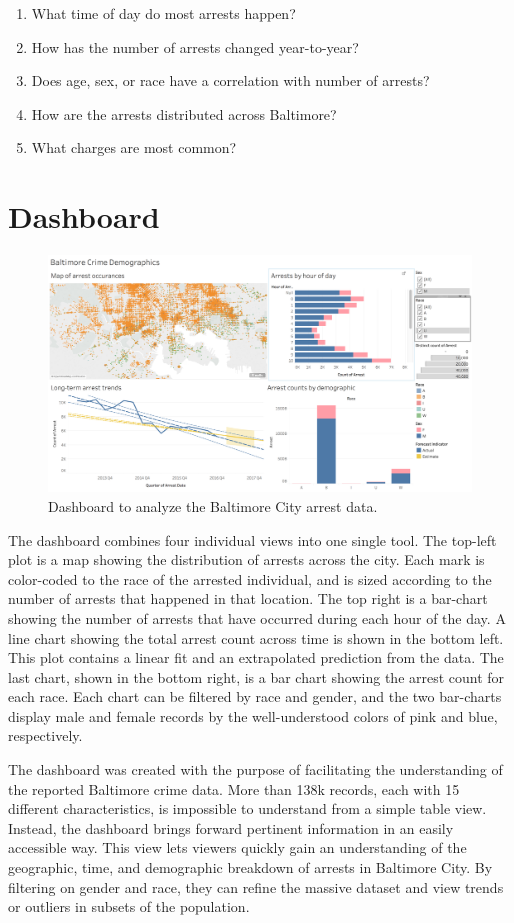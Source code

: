 \documentclass[a4paper,11pt]{article}
\begin{document}
\begin{enumerate}
  \item What time of day do most arrests happen?
  \item How has the number of arrests changed year-to-year?
  \item Does age, sex, or race have a correlation with number of arrests?
  \item How are the arrests distributed across Baltimore?
  \item What charges are most common?
\end{enumerate}

\section{Dashboard}

\begin{figure}[h!]
\caption{Dashboard to analyze the Baltimore City arrest data.} 
\centering
\includegraphics[width=.8\textwidth]{dashboard.png}
\end{figure}

The dashboard combines four individual views into one single tool.  The top-left plot is a map showing the distribution of arrests across the city.  Each mark is color-coded to the race of the arrested individual, and is sized according to the number of arrests that happened in that location.  The top right is a bar-chart showing the number of arrests that have occurred during each hour of the day.  A line chart showing the total arrest count across time is shown in the bottom left.  This plot contains a linear fit and an extrapolated prediction from the data.  The last chart, shown in the bottom right, is a bar chart showing the arrest count for each race.  Each chart can be filtered by race and gender, and the two bar-charts display male and female records by the well-understood colors of pink and blue, respectively.  

The dashboard was created with the purpose of facilitating the understanding of the reported Baltimore crime data.  More than 138k records, each with 15 different characteristics, is impossible to understand from a simple table view.  Instead, the dashboard brings forward pertinent information in an easily accessible way.  This view lets viewers quickly gain an understanding of the geographic, time, and demographic breakdown of arrests in Baltimore City.  By filtering on gender and race, they can refine the massive dataset and view trends or outliers in subsets of the population.
\end{document}
